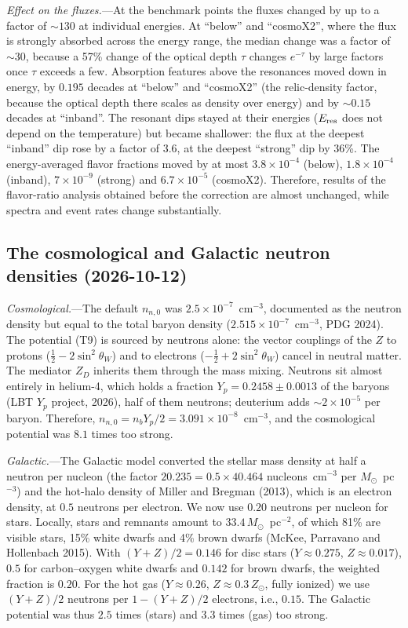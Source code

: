 \documentclass[11pt,a4paper]{article}
\newcommand{\Eres}{E_{\rm res}}
\begin{document}
\textit{Effect on the fluxes.}---At the benchmark points the fluxes changed by up to a factor
of $\sim130$ at individual energies. At ``below'' and ``cosmoX2'', where the flux is strongly
absorbed across the energy range, the median change was a factor of $\sim30$, because a 57\%
change of the optical depth $\tau$ changes $e^{-\tau}$ by large factors once $\tau$ exceeds a
few. Absorption features above the resonances moved down in energy, by $0.195$ decades at
``below'' and ``cosmoX2'' (the relic-density factor, because the optical depth there scales as
density over energy) and by $\sim0.15$ decades at ``inband''. The resonant dips stayed at their energies ($\Eres$ does not depend on the
temperature) but became shallower: the flux at the deepest ``inband'' dip rose by a factor of
$3.6$, at the deepest ``strong'' dip by 36\%. The energy-averaged flavor fractions moved by at
most $3.8\times10^{-4}$ (below), $1.8\times10^{-4}$ (inband), $7\times10^{-9}$ (strong) and
$6.7\times10^{-5}$ (cosmoX2). Therefore, results of the flavor-ratio analysis obtained before the
correction are almost unchanged, while spectra and event rates change substantially.

\subsection{The cosmological and Galactic neutron densities (2026-10-12)}
\label{app:neutrons}

\textit{Cosmological.}---The default $n_{n,0}$ was $2.5\times10^{-7}$~cm$^{-3}$, documented as the
neutron density but equal to the total baryon density ($2.515\times10^{-7}$~cm$^{-3}$, PDG 2024).
The potential (T9) is sourced by neutrons alone: the vector couplings of the $Z$ to protons
($\tfrac12 - 2\sin^2\theta_W$) and to electrons ($-\tfrac12 + 2\sin^2\theta_W$) cancel in neutral
matter. The mediator $Z_D$ inherits them through the mass mixing. Neutrons sit almost entirely in
helium-4, which holds a fraction $Y_p = 0.2458 \pm 0.0013$ of the baryons (LBT $Y_p$ project,
2026), half of them neutrons; deuterium adds $\sim2\times10^{-5}$ per baryon. Therefore,
$n_{n,0} = n_b Y_p/2 = 3.091\times10^{-8}$~cm$^{-3}$, and the cosmological potential was $8.1$
times too strong.

\textit{Galactic.}---The Galactic model converted the stellar mass density at half a neutron per
nucleon (the factor $20.235 = 0.5\times40.464$ nucleons~cm$^{-3}$ per $M_\odot$~pc$^{-3}$) and
the hot-halo density of Miller and Bregman (2013), which is an electron density, at $0.5$
neutrons per electron. We now use $0.20$ neutrons per nucleon for stars. Locally, stars and
remnants amount to $33.4\,M_\odot$~pc$^{-2}$, of which 81\% are visible stars, 15\% white dwarfs and
4\% brown dwarfs (McKee, Parravano and Hollenbach 2015). With $(Y+Z)/2 = 0.146$ for disc stars
($Y\approx0.275$, $Z\approx0.017$), $0.5$ for carbon--oxygen white dwarfs and $0.142$ for brown
dwarfs, the weighted fraction is $0.20$. For the hot gas ($Y \approx 0.26$, $Z \approx 0.3\,Z_\odot$,
fully ionized) we use $(Y+Z)/2$ neutrons per $1-(Y+Z)/2$ electrons, i.e., $0.15$. The Galactic
potential was thus $2.5$ times (stars) and $3.3$ times (gas) too strong.
\end{document}
